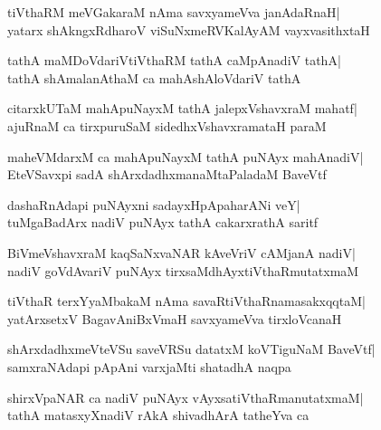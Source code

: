 \documentclass[twoside,12pt,openright]{book}
\newcounter{shloka}[chapter]
\begin{document}
\begin{shloka}%
tiVthaRM meVGakaraM nAma savxyameVva janAdaRnaH|\\
yatarx shAkngxRdharoV viSuNxmeRVKalAyAM vayxvasithxtaH
\end{shloka}

\begin{shloka}%
tathA maMDoVdariVtiVthaRM tathA caMpAnadiV tathA|\\
tathA shAmalanAthaM ca mahAshAloVdariV tathA
\end{shloka}

\begin{shloka}%
citarxkUTaM mahApuNayxM tathA jalepxVshavxraM mahatf|\\
ajuRnaM ca tirxpuruSaM sidedhxVshavxramataH paraM
\end{shloka}

\begin{shloka}%
maheVMdarxM ca mahApuNayxM tathA puNAyx mahAnadiV|\\
EteVSavxpi sadA shArxdadhxmanaMtaPaladaM BaveVtf
\end{shloka}

\begin{shloka}%
dashaRnAdapi puNAyxni sadayxHpApaharANi veY|\\
tuMgaBadArx nadiV puNAyx tathA cakarxrathA saritf
\end{shloka}

\begin{shloka}%
BiVmeVshavxraM kaqSaNxvaNAR kAveVriV cAMjanA nadiV|\\
nadiV goVdAvariV puNAyx tirxsaMdhAyxtiVthaRmutatxmaM
\end{shloka}

\begin{shloka}%
tiVthaR terxYyaMbakaM nAma savaRtiVthaRnamasakxqqtaM|\\
yatArxsetxV BagavAniBxVmaH savxyameVva tirxloVcanaH
\end{shloka}

\begin{shloka}%
shArxdadhxmeVteVSu saveVRSu datatxM koVTiguNaM BaveVtf|\\
samxraNAdapi pApAni varxjaMti shatadhA naqpa
\end{shloka}

\begin{shloka}%
shirxVpaNAR ca nadiV puNAyx vAyxsatiVthaRmanutatxmaM|\\
tathA matasxyXnadiV rAkA shivadhArA tatheYva ca 
\end{shloka}
\end{document}
